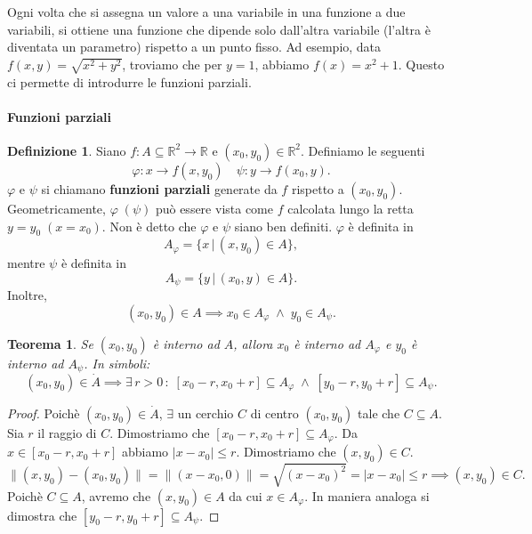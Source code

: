 \documentclass{article}
\theoremstyle{plain}
\newtheorem{thm}{Teorema}[section]
\theoremstyle{definition}
\newtheorem{defn}{Definizione}[section]
\theoremstyle{remark}
\begin{document}
\vspace{10pt}

Ogni volta che si assegna un valore a una variabile in una funzione a due variabili, si ottiene una funzione che dipende solo dall'altra variabile (l'altra è diventata un parametro) rispetto a un punto fisso.
Ad esempio, data $f(x,y)=\sqrt{x^2+y^2}$, troviamo che per $y=1$, abbiamo $f(x)={x^2+1}$.
Questo ci permette di introdurre le funzioni parziali.

\vspace{10pt}

\paragraph{Funzioni parziali}
\begin{bxthm}
\begin{defn}\label{funzparz}
    Siano $f:A\subseteq\mathbb{R}^2\to\mathbb{R}$ e $(x_0,y_0)\in\mathbb{R}^2$.
    Definiamo le seguenti \[\varphi :x\to f(x,y_0)\quad\psi :y\to f(x_0,y).\]
    $\varphi$ e $\psi$ si chiamano \textbf{funzioni parziali} generate da $f$ rispetto a $(x_0,y_0)$.
    Geometricamente, $\varphi\;(\psi)$  può essere vista come $f$ calcolata lungo la retta $y=y_0\;(x=x_0)$.
    Non è detto che $\varphi$ e $\psi$ siano ben definiti.
    $\varphi$ è definita in \[A_\varphi=\{x\,|\,(x,y_0)\in A\},\] mentre $\psi$ è definita in \[A_\psi=\{y\,|\,(x_0,y)\in A\}.\]
    Inoltre, 
    \[(x_0,y_0)\in A\implies x_0\in A_\varphi\;\land\;y_0\in A_\psi.\]
\end{defn}
\end{bxthm}

\vspace{10pt}

\begin{bxthm}
\begin{thm}
    Se $(x_0,y_0)$ è interno ad $A$, allora $x_0$ è interno ad $A_\varphi$ e $y_0$ è interno ad $A_\psi$.
    In simboli:
    \[(x_0,y_0)\in\dot{A}\implies\exists\, r>0\,:\;[x_0-r,x_0+r]\subseteq A_\varphi\;\land\;[y_0-r,y_0+r]\subseteq A_\psi.\]
\end{thm}
\end{bxthm}
\begin{proof}
    Poichè $(x_0,y_0)\in\dot{A}$, $\exists$ un cerchio $C$ di centro $(x_0,y_0)$ tale che $C\subseteq A$. Sia $r$ il raggio di $C$.
    Dimostriamo che $[x_0-r,x_0+r]\subseteq A_\varphi$. 
    Da $x\in [x_0-r,x_0+r]$ abbiamo $|x-x_0|\leq r$.
    Dimostriamo che $(x,y_0)\in C$.
    \[\| (x,y_0)-(x_0,y_0) \|=\| (x-x_0,0) \|=\sqrt{(x-x_0)^2}=|x-x_0|\leq r\implies (x,y_0)\in C.\]
    Poichè $C\subseteq A$, avremo che $(x,y_0)\in A$ da cui $x\in A_\varphi$.
    In maniera analoga si dimostra che $[y_0-r,y_0+r]\subseteq A_\psi$.
\end{proof}
\end{document}

